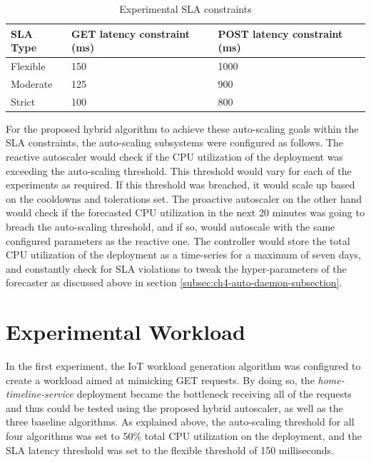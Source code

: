 \begin{table}
    \caption{Experimental SLA constraints}\label{tab:experiment-sla-values}
    \centering
    \begin{tabular}{|l|l|l|}
        \hline
        SLA Type & GET latency constraint (ms) & POST latency constraint (ms)\\
        \hline
        Flexible    & 150   & 1000\\
        Moderate    & 125   & 900\\
        Strict      & 100   & 800\\
        \hline
    \end{tabular}
\end{table}

For the proposed hybrid algorithm to achieve these auto-scaling goals within the SLA constraints, the auto-scaling subsystems were configured as follows. The reactive autoscaler would check if the CPU utilization of the deployment was exceeding the auto-scaling threshold. This threshold would vary for each of the experiments as required. If this threshold was breached, it would scale up based on the cooldowns and tolerations set. The proactive autoscaler on the other hand would check if the forecasted CPU utilization in the next 20 minutes was going to breach the auto-scaling threshold, and if so, would autoscale with the same configured parameters as the reactive one. The controller would store the total CPU utilization of the deployment as a time-series for a maximum of seven days, and constantly check for SLA violations to tweak the hyper-parameters of the forecaster as discussed above in section \ref{subsec:ch4-auto-daemon-subsection}.\par

\section{Experimental Workload}
\label{sec:ch5-exp-workload}

In the first experiment, the IoT workload generation algorithm was configured to create a workload aimed at mimicking GET requests. By doing so, the \textit{home-timeline-service} deployment became the bottleneck receiving all of the requests and thus could be tested using the proposed hybrid autoscaler, as well as the three baseline algorithms. As explained above, the auto-scaling threshold for all four algorithms was set to 50\% total CPU utilization on the deployment, and the SLA latency threshold was set to the flexible threshold of 150 milliseconds.\par

